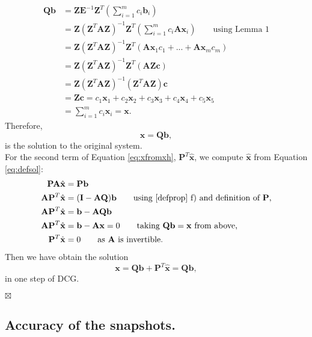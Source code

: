 \documentclass[12pt]{article}
\numberwithin{equation}{section}
\begin{document}
\begin{align*}
\mathbf{Q}\mathbf{b}&=\mathbf{Z}\mathbf{E}^{-1}\mathbf{Z}^T\left(\sum_{i=1}^m {c}_i\mathbf{b}_i\right)\\
&=\mathbf{Z}(\mathbf{Z}^T\mathbf{A}\mathbf{Z})^{-1}\mathbf{Z}^T\left(\sum_{i=1}^m {c}_i\mathbf{A}\mathbf{x}_i\right)\qquad \text{using Lemma 1}\\
&=\mathbf{Z}(\mathbf{Z}^T\mathbf{A}\mathbf{Z})^{-1}\mathbf{Z}^T\left( \mathbf{A}\mathbf{x}_1{c}_1+...+\mathbf{A}\mathbf{x}_m{c}_m\right) \\
&=\mathbf{Z}(\mathbf{Z}^T\mathbf{A}\mathbf{Z})^{-1}\mathbf{Z}^T(\mathbf{A}\mathbf{Z}\mathbf{c})  \\
&=\mathbf{Z}(\mathbf{Z}^T\mathbf{A}\mathbf{Z})^{-1}(\mathbf{Z}^T\mathbf{A}\mathbf{Z})\mathbf{c} \\
&=\mathbf{Z}\mathbf{c}= c_1\mathbf{x}_1+c_2\mathbf{x}_2+c_3\mathbf{x}_3+c_4\mathbf{x}_4+c_5\mathbf{x}_5\\
& =\sum_{i=1}^m {c}_i\mathbf{x}_i=\mathbf{x}.
\end{align*}
Therefore,
\begin{equation}\label{eq:xqb}
\mathbf{x}=\mathbf{Q}\mathbf{b},
\end{equation}
is the solution to the original system.\\ 
For the second term of Equation \eqref{eq:xfromxh}, $\mathbf{P}^T\mathbf{\hat{x}}$, we compute $\mathbf{\hat{x}}$ from Equation \eqref{eq:defsol}:
\begin{align*}
    \mathbf{P}\mathbf{A}\hat{\mathbf{x}}&=\mathbf{P}\mathbf{b}\\
    \mathbf{A}\mathbf{P}^T\hat{\mathbf{x}}&=(\mathbf{I}-\mathbf{A}\mathbf{Q})\mathbf{b} \qquad \text{using \ref{defprop} f) and definition of $\mathbf{P}$,}\\
        \mathbf{A}\mathbf{P}^T\hat{\mathbf{x}}&=\mathbf{b}-\mathbf{A}\mathbf{Q}\mathbf{b}\\
        \mathbf{A}\mathbf{P}^T\hat{\mathbf{x}}&=\mathbf{b}-\mathbf{A}\mathbf{x}=0 \qquad \text{taking $\mathbf{Q}\mathbf{b}=\mathbf{x}$ from above,}\\
          \mathbf{P}^T\hat{\mathbf{x}}&=0 \qquad \text{as $\mathbf{A}$ is invertible.}
\end{align*}
Then we have obtain the solution 
$$\mathbf{x}=\mathbf{Q}\mathbf{b}+\mathbf{P}^T\mathbf{\hat{x}}=\mathbf{Q}\mathbf{b},$$ 
in one step of DCG.
\begin{flushright}
$\boxtimes $                
\end{flushright}
\subsection{Accuracy of the snapshots.}\label{accs}
\end{document}
